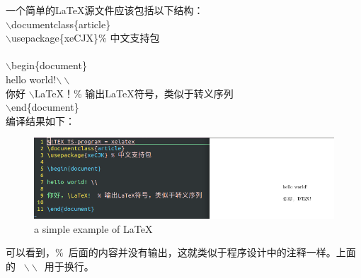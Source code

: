 \documentclass[12pt]{article}
\begin{document}
一个简单的\LaTeX 源文件应该包括以下结构：\\
$\backslash$documentclass\{article\}\\ 
$\backslash$usepackage\{xeCJX\}\quad \% 中文支持包\\
\\$\backslash$begin\{document\} \\
hello world!\quad$\backslash\backslash$ \\
你好 $\backslash$LaTeX！\quad\% 输出LaTeX符号，类似于转义序列\\
$\backslash$end\{document\}\\

编译结果如下：
\begin{figure}[h]
	\centering
	\includegraphics[scale=0.5]{1}
	\caption{a simple example of \LaTeX }
\end{figure}

	

可以看到，\%\ 后面的内容并没有输出，这就类似于程序设计中的注释一样。上面的
\ $\backslash\backslash$\ 用于换行。
\end{document}
